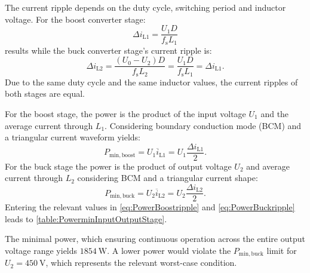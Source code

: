
\begin{solutionblock}
	The current ripple depends on the duty cycle, switching period and inductor voltage.
	For the boost converter stage:
	\begin{equation}
		\Delta i_\mathrm{L1}=\frac{U_\mathrm{1}D}{f_\mathrm{s}L_1}
		\label{eq:Boostripple}
	\end{equation}
	results while the buck converter stage's current ripple is:
	\begin{equation}
		\Delta i_\mathrm{L2}=\frac{\left(U_\mathrm{0}-U_\mathrm{2}\right)D}{f_\mathrm{s}L_2} = \frac{U_\mathrm{1}D}{f_\mathrm{s}L_1} = \Delta i_\mathrm{L1}.
		\label{eq:Buckripple}
	\end{equation}
	Due to the same duty cycle and the same inductor values, the current ripples of both stages are equal.
\end{solutionblock}


\begin{solutionblock}
	For the boost stage, the power is the product of the input voltage $U_1$ and the average current through $L_1$. Considering boundary conduction mode (BCM) and a triangular	current waveform yields:
	\begin{equation}
		P_\mathrm{min,boost}=U_\mathrm{1}\overline{i}_\mathrm{L1}=U_\mathrm{1}\frac{\Delta i_\mathrm{L1}}{2}.
		\label{eq:PowerBoostripple}
	\end{equation}
	For the buck stage the power is the product of output voltage
	$U_\mathrm{2}$ and average current through $L_2$ considering BCM and a triangular current shape:
	\begin{equation}
		P_\mathrm{min,buck}=U_\mathrm{2}\overline{i}_\mathrm{L2}=U_\mathrm{2}\frac{\Delta i_\mathrm{L2}}{2}.
		\label{eq:PowerBuckripple}
	\end{equation}
	Entering the relevant values in \eqref{eq:PowerBoostripple} and \eqref{eq:PowerBuckripple} leads to \autoref{table:PowerminInputOutputStage}.
	
	The minimal power, which ensuring continuous operation across the entire output voltage range
	yields  $\SI{1854}{\watt}$. A lower power would violate the $P_{\mathrm{min,buck}}$ limit for $U_\mathrm{2}=\SI{450}{\volt}$, which represents the relevant worst-case condition.
\end{solutionblock}

